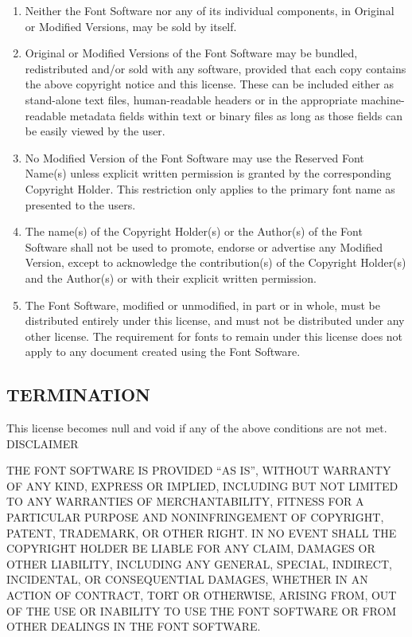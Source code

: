 \begin{enumerate}
    \item Neither the Font Software nor any of its individual components, in Original or Modified Versions, may be sold by itself.
    
    \item Original or Modified Versions of the Font Software may be bundled, redistributed and/or sold with any software, provided that each copy contains the above copyright notice and this license. These can be included either as stand-alone text files, human-readable headers or in the appropriate machine-readable metadata fields within text or binary files as long as those fields can be easily viewed by the user.
    
    \item No Modified Version of the Font Software may use the Reserved Font Name(s) unless explicit written permission is granted by the corresponding Copyright Holder. This restriction only applies to the primary font name as presented to the users.

    \item The name(s) of the Copyright Holder(s) or the Author(s) of the Font Software shall not be used to promote, endorse or advertise any Modified Version, except to acknowledge the contribution(s) of the Copyright Holder(s) and the Author(s) or with their explicit written permission.

    \item The Font Software, modified or unmodified, in part or in whole, must be distributed entirely under this license, and must not be distributed under any other license. The requirement for fonts to remain under this license does not apply to any document created using the Font Software.
\end{enumerate}

\subsection{TERMINATION}

This license becomes null and void if any of the above conditions are not met.
DISCLAIMER

THE FONT SOFTWARE IS PROVIDED “AS IS”, WITHOUT WARRANTY OF ANY KIND, EXPRESS OR IMPLIED, INCLUDING BUT NOT LIMITED TO ANY WARRANTIES OF MERCHANTABILITY, FITNESS FOR A PARTICULAR PURPOSE AND NONINFRINGEMENT OF COPYRIGHT, PATENT, TRADEMARK, OR OTHER RIGHT. IN NO EVENT SHALL THE COPYRIGHT HOLDER BE LIABLE FOR ANY CLAIM, DAMAGES OR OTHER LIABILITY, INCLUDING ANY GENERAL, SPECIAL, INDIRECT, INCIDENTAL, OR CONSEQUENTIAL DAMAGES, WHETHER IN AN ACTION OF CONTRACT, TORT OR OTHERWISE, ARISING FROM, OUT OF THE USE OR INABILITY TO USE THE FONT SOFTWARE OR FROM OTHER DEALINGS IN THE FONT SOFTWARE.